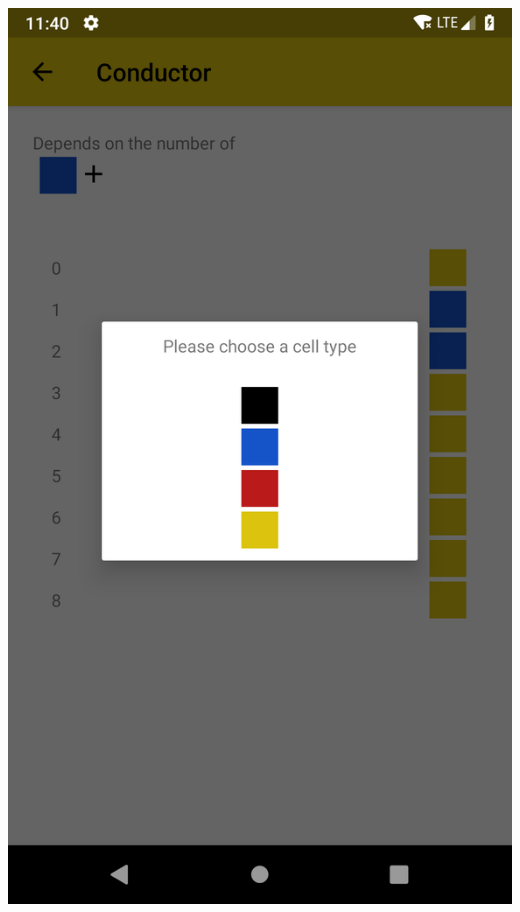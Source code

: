 \documentclass{report}
\begin{document}
\begin{minipage}{.45\textwidth}
  \begin{minipage}{.45\linewidth}
    \includegraphics[width=\linewidth]{screens/cell_configuration.png}
  \end{minipage}\hfill
  \begin{minipage}{.45\linewidth}

\end{minipage}
\end{minipage}
\end{document}
